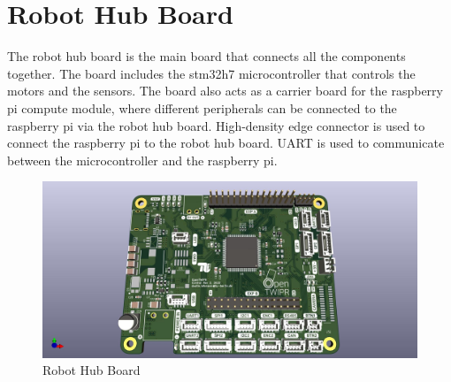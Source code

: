 \section{Robot Hub Board}
The robot hub board is the main board that connects all the components together.
The board includes the stm32h7 microcontroller that controls the motors and the sensors.
The board also acts as a carrier board for the raspberry pi compute module, where different peripherals can be connected to the raspberry pi via the robot hub board.
High-density edge connector is used to connect the raspberry pi to the robot hub board.
UART is used to communicate between the microcontroller and the raspberry pi.
\begin{figure}[h]
	\centering
	\includegraphics[width=1\linewidth]{Robot_Hub_Board}
	\caption[ Robot Hub Board ]{Robot Hub Board}
	\label{fig:robothubboard}
\end{figure}

